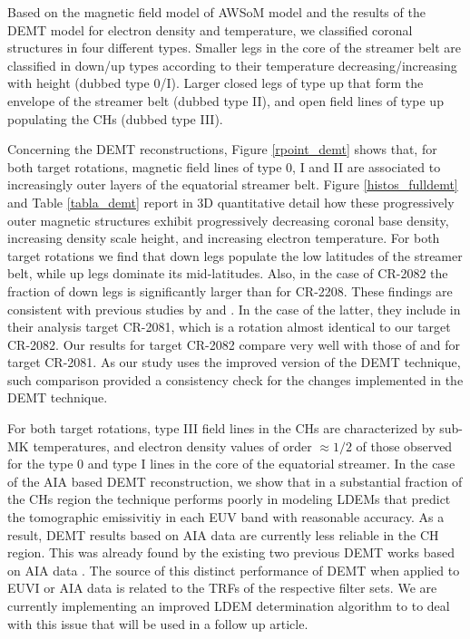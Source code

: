 \documentclass[namedreferences]{solarphysics}
\begin{document}
\begin{article}
{Based on the magnetic field model of AWSoM model and the results of the DEMT model for electron density and temperature, we classified coronal structures in four different types. Smaller legs in the core of the streamer belt are classified in down/up types according to their temperature decreasing/increasing with height (dubbed type 0/I). Larger closed legs of type up that form the envelope of the streamer belt (dubbed type II), and open field lines of type up populating the CHs (dubbed type III).}

Concerning the DEMT reconstructions, Figure \ref{rpoint_demt} shows that, for both target rotations, magnetic field lines of type 0, I and II are associated to increasingly outer {layers} of the equatorial streamer belt. Figure \ref{histos_fulldemt} and Table \ref{tabla_demt} report in 3D quantitative detail how these progressively outer magnetic structures exhibit progressively decreasing coronal base density, increasing density scale height, and increasing electron temperature. For both target rotations we find that down legs populate the low latitudes of the streamer belt, while up legs dominate its mid-latitudes. Also, in the case of CR-2082 the fraction of down legs is significantly larger than for CR-2208. These findings are consistent with previous studies by \citet{huang_2012} and \citet{nuevo_2013}. In the case of the latter, they include in their analysis target CR-2081, which is a rotation almost identical to our target CR-2082. Our results for target CR-2082 compare very well with those of \citet{nuevo_2015} and \citet{lloveras_2017} for target CR-2081. As our study uses the improved version of the DEMT technique, such comparison provided a consistency check for the changes implemented in the DEMT technique.



{{For both target rotations}, type III field lines in the CHs are characterized by sub-MK temperatures, and electron density values of order $\approx 1/2$ of those observed for the type 0 and type I lines in the core of the equatorial streamer. In the case of the AIA based DEMT reconstruction, we show that in a substantial fraction of the CHs region the technique performs poorly in modeling LDEMs that predict the tomographic emissivitiy in each EUV band with reasonable accuracy. As a result, DEMT results based on AIA data are currently less reliable in the CH region. This was already found by the existing two previous DEMT works based on AIA data \citep{nuevo_2015,maccormack_2017}. The source of this distinct performance of DEMT when applied to EUVI or AIA data is related to the TRFs of the respective filter sets. We are currently implementing an improved LDEM determination algorithm to to deal with this issue that will be used in a follow up article.}


\end{article}
\end{document}
